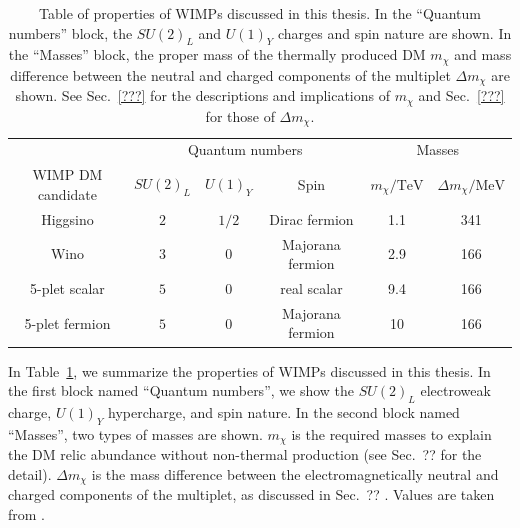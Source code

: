 \documentclass[12pt,twoside,book]{article}
\begin{document}
\begin{table}
  \centering
  \begin{tabular}{c|ccc|cc}
    & \multicolumn{3}{c|}{Quantum numbers} & \multicolumn{2}{c}{Masses}\\
    WIMP DM candidate & $SU(2)_L$ & $U(1)_Y$ & Spin & $m_\chi / \mathrm{TeV}$ &
    $\Delta m_\chi / \mathrm{MeV}$ \\
    \hline
    Higgsino & $2$ & $1/2$ & Dirac fermion & 1.1 & 341 \\
    Wino & $3$ & $0$ & Majorana fermion & 2.9 & 166 \\
    5-plet scalar & $5$ & $0$ & real scalar & 9.4 & 166 \\
    5-plet fermion & $5$ & $0$ & Majorana fermion & 10 & 166
  \end{tabular}
  \caption{
    Table of properties of WIMPs discussed in this thesis.
    In the ``Quantum numbers'' block, the $SU(2)_L$ and $U(1)_Y$ charges and spin nature are shown.
    In the ``Masses'' block, the proper mass of the thermally produced DM $m_\chi$ and mass difference between the neutral and charged components of the multiplet $\Delta m_\chi$ are shown.
    See Sec.~\ref{???}  for the descriptions and implications of $m_\chi$ and Sec.~\ref{???}  for those of $\Delta m_\chi$.
  }
  \label{tab:WIMP_property}
\end{table}

In Table~\ref{tab:WIMP_property}, we summarize the properties of WIMPs discussed in this thesis.
In the first block named ``Quantum numbers'', we show the $SU(2)_L$ electroweak charge, $U(1)_Y$ hypercharge, and spin nature.
In the second block named ``Masses'', two types of masses are shown.
$m_\chi$ is the required masses to explain the DM relic abundance without non-thermal production (see Sec.~??  for the detail).
$\Delta m_\chi$ is the mass difference between the electromagnetically neutral and charged components of the multiplet, as discussed in Sec.~?? .
Values are taken from \cite{Farina:2013mla, ArkaniHamed:2006mb, Hisano:2006nn,  Cirelli:2007xd, Moroi:2013sla, Beneke:2016ync}.


% 
% 
\end{document}
